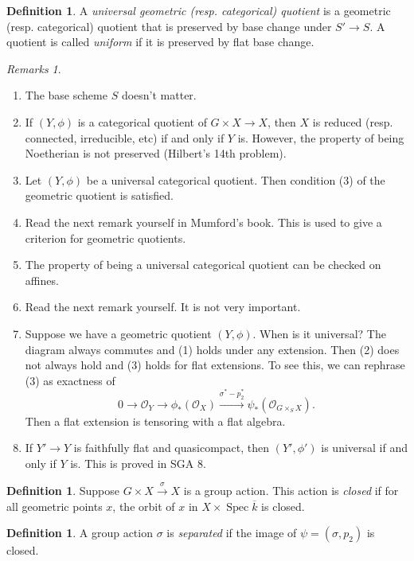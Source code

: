 \documentclass[leqno, openany]{memoir}
\theoremstyle{definition}
\newtheorem{defn}[thm]{Definition}
\theoremstyle{remark}
\newtheorem{rmks}[thm]{Remarks}
\theoremstyle{plain}
\theoremstyle{definition}
\theoremstyle{remark}
\newcommand{\mc}[1]{\mathcal{#1}}
\newcommand{\ol}[1]{\overline{#1}}
\DeclareMathOperator{\Spec}{Spec}
\begin{document}
\begin{defn} A \textit{universal geometric (resp. categorical) quotient} is a
    geometric (resp. categorical) quotient that is preserved by base change
    under $S' \to S$. A quotient is called \textit{uniform} if it is preserved
    by flat base change.  \end{defn}

\begin{rmks} \begin{enumerate} \item The base scheme $S$ doesn't matter.  \item
    If $(Y, \phi)$ is a categorical quotient of $G \times X \to X$, then $X$ is
    reduced (resp. connected, irreducible, etc) if and only if $Y$ is. However,
    the property of being Noetherian is not preserved (Hilbert's 14th problem).
\item Let $(Y, \phi)$ be a universal categorical quotient. Then condition (3)
    of the geometric quotient is satisfied.  \item Read the next remark
    yourself in Mumford's book. This is used to give a criterion for geometric
    quotients.  \item The property of being a universal categorical quotient
    can be checked on affines.  \item Read the next remark yourself. It is not
    very important.  \item Suppose we have a geometric quotient $(Y, \phi)$.
    When is it universal? The diagram always commutes and (1) holds under any
    extension. Then (2) does not always hold and (3) holds for flat extensions.
    To see this, we can rephrase (3) as exactness of \[ 0 \to \mc{O}_Y \to
    \phi_*(\mc{O}_X) \xrightarrow{\sigma^* - p_2^*} \psi_*(\mc{O}_{G \times_S
X}). \] Then a flat extension is tensoring with a flat algebra.  \item If $Y'
\to Y$ is faithfully flat and quasicompact, then $(Y', \phi')$ is universal if
and only if $Y$ is. This is proved in SGA 8.  \end{enumerate} \end{rmks}

\begin{defn} Suppose $G \times X \xrightarrow{\sigma} X$ is a group action.
This action is \textit{closed} if for all geometric points $x$, the orbit of
$x$ in $X \times \Spec \ol{k}$ is closed.  \end{defn}

\begin{defn} A group action $\sigma$ is \textit{separated} if the image of
$\psi = (\sigma, p_2)$ is closed.  \end{defn}
\end{document}
